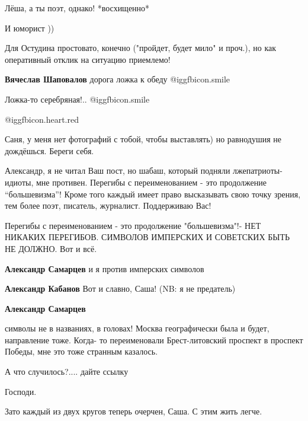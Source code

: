 \begin{itemize}
\begin{itemize} %
Лёша, а ты поэт, однако! *восхищенно*

И юморист ))

Для Остудина простовато, конечно ("пройдет, будет мило" и проч.), но как оперативный отклик на ситуацию приемлемо!

\textbf{Вячеслав Шаповалов} дорога ложка к обеду  @igg{fbicon.smile} 

Ложка-то серебряная!..  @igg{fbicon.smile} 

\end{itemize} %

@igg{fbicon.heart.red}

Саня, у меня нет фотографий с тобой, чтобы выставлять) но равнодушия не дождёшься. Береги себя.


Александр, я не читал Ваш пост, но шабаш, который подняли лжепатриоты-идиоты,
мне противен. Перегибы с переименованием - это продолжение \enquote{большевизма}! Кроме
того каждый имеет право высказывать свою точку зрения, тем более поэт,
писатель, журналист. Поддерживаю Вас!

\begin{itemize} %

Перегибы с переименованием - это продолжение "большевизма"!- НЕТ НИКАКИХ
ПЕРЕГИБОВ. СИМВОЛОВ ИМПЕРСКИХ И СОВЕТСКИХ БЫТЬ НЕ ДОЛЖНО. Вот и всё.

\textbf{Александр Самарцев} и я против имперских символов

\textbf{Александр Кабанов} Вот и славно, Саша! (NB: я не предатель)

\textbf{Александр Самарцев} 

символы не в названиях, в головах! Москва географически была и будет,
направление тоже. Когда- то переименовали Брест-литовский проспект в проспект
Победы, мне это тоже странным казалось.

\end{itemize} %

А что случилось?.... дайте ссылку

Господи.

Зато каждый из двух кругов теперь очерчен, Саша. С этим жить легче.


\end{itemize}
